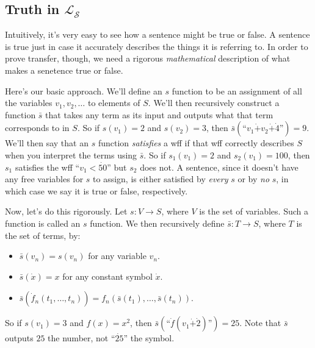 \subsection{Truth in \texorpdfstring{$\mathcal{L}_\mathscr{S}$}{L S}}\label{sec:truthInLS}
Intuitively, it's very easy to see how a sentence might be true or false. A sentence is true just in case it accurately describes the things it is referring to. In order to prove transfer, though, we need a rigorous \textit{mathematical} description of what makes a senetence true or false.

Here's our basic approach. We'll define an $s$ function to be an assignment of all the variables $v_1, v_2, \ldots$ to elements of $S$. We'll then recursively construct a function $\bar s$ that takes any term as its input and outputs what that term corresponds to in $S$. So if $s(v_1) = 2$ and $s(v_2) = 3$, then $\bar s(\text{``}v_1 \dot + v_2 \dot + \dot 4\text{''}) = 9$. We'll then say that an $s$ function \textit{satisfies} a wff if that wff correctly describes $S$ when you interpret the terms using $\bar s$. So if $s_1 (v_1) = 2$ and $s_2(v_1) = 100$, then $s_1$ satisfies the wff ``$v_1 < \dot{50}$'' but $s_2$ does not. A sentence, since it doesn't have any free variables for $s$ to assign, is either satisfied by \textit{every} $s$ or by \textit{no} $s$, in which case we say it is true or false, respectively.

Now, let's do this rigorously. Let $s: V \to S$, where $V$ is the set of variables. Such a function is called an $s$ function. We then recursively define $\bar s : T \to S$, where $T$ is the set of terms, by:
\begin{itemize}
    \item $\bar s(v_n) = s(v_n)$ for any variable $v_n$.
    \item $\bar s(\dot x) = x$ for any constant symbol $\dot x$.
    \item $\bar s(\dot f_n(t_1, \ldots, t_n)) = f_n(\bar s(t_1), \ldots, \bar s(t_n))$.
\end{itemize}

So if $s(v_1) = 3$ and $f(x) = x^2$, then $\bar s(\text{``}\dot f(v_1 \dot + \dot 2)\text{''}) = 25$. Note that $\bar s$ outputs $25$ the number, not ``$\dot{25}$'' the symbol.

